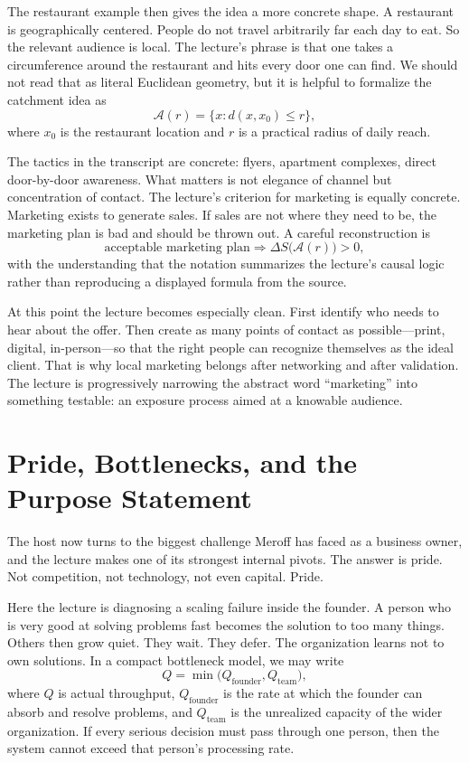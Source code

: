 The restaurant example then gives the idea a more concrete shape. A restaurant is geographically centered. People do not travel arbitrarily far each day to eat. So the relevant audience is local. The lecture's phrase is that one takes a circumference around the restaurant and hits every door one can find. We should not read that as literal Euclidean geometry, but it is helpful to formalize the catchment idea as
\begin{equation}
\mathcal{A}(r)=\{x:d(x,x_0)\le r\},
\end{equation}
where $x_0$ is the restaurant location and $r$ is a practical radius of daily reach.

The tactics in the transcript are concrete: flyers, apartment complexes, direct door-by-door awareness. What matters is not elegance of channel but concentration of contact. The lecture's criterion for marketing is equally concrete. Marketing exists to generate sales. If sales are not where they need to be, the marketing plan is bad and should be thrown out. A careful reconstruction is
\begin{equation}
\text{acceptable marketing plan}
\Rightarrow
\Delta S\bigl(\mathcal{A}(r)\bigr)>0,
\end{equation}
with the understanding that the notation summarizes the lecture's causal logic rather than reproducing a displayed formula from the source.

At this point the lecture becomes especially clean. First identify who needs to hear about the offer. Then create as many points of contact as possible---print, digital, in-person---so that the right people can recognize themselves as the ideal client. That is why local marketing belongs after networking and after validation. The lecture is progressively narrowing the abstract word ``marketing'' into something testable: an exposure process aimed at a knowable audience.

\section{Pride, Bottlenecks, and the Purpose Statement}

The host now turns to the biggest challenge Meroff has faced as a business owner, and the lecture makes one of its strongest internal pivots. The answer is pride. Not competition, not technology, not even capital. Pride.

Here the lecture is diagnosing a scaling failure inside the founder. A person who is very good at solving problems fast becomes the solution to too many things. Others then grow quiet. They wait. They defer. The organization learns not to own solutions. In a compact bottleneck model, we may write
\begin{equation}
Q=\min\!\bigl(Q_{\text{founder}},Q_{\text{team}}\bigr),
\end{equation}
where $Q$ is actual throughput, $Q_{\text{founder}}$ is the rate at which the founder can absorb and resolve problems, and $Q_{\text{team}}$ is the unrealized capacity of the wider organization. If every serious decision must pass through one person, then the system cannot exceed that person's processing rate.

